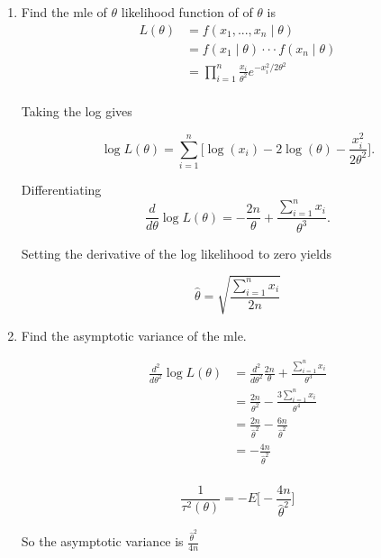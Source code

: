 \documentclass{tufte-book}
\theoremstyle{mytheoremstyle}
\theoremstyle{mylemstyle}
\theoremstyle{mydefstyle}
\begin{document}
\begin{enumerate}
\item Find the mle of $\theta$
 likelihood function of of $\theta$ is
\begin{align*}
L(\theta) &= f(x_1,...,x_n \mid \theta)\\
&= f(x_1 \mid \theta) \cdot \cdot \cdot f(x_n \mid \theta)\\
&= \prod_{i=1}^n \frac{x_i}{\theta^2}e^{-x_i^2/2\theta^2}\\
\end{align*}

Taking the log gives

\[ \log L(\theta) = \sum_{i=1}^n \Big[ \log(x_i) - 2\log(\theta) - \frac{x_i^2}{2\theta^2} \Big]. \]

Differentiating
\[ \frac{d}{d\theta} \log L(\theta) = -\frac{2n}{\theta} + \frac{\sum_{i=1}^n x_i}{\theta^3}. \]

Setting the derivative of the log likelihood to zero yields

\[\hat{\theta} = \sqrt{\frac{\sum_{i=1}^n x_i}{2n}} \]
\item Find the asymptotic variance of the mle.

\begin{align*}
\frac{d^2}{d\theta^2} \log L(\theta)  &= \frac{d^2}{d\theta^2} \frac{2n}{\theta} + \frac{\sum_{i=1}^n x_i}{\theta^3}\\
&= \frac{2n}{\theta^2} - \frac{3 \sum_{i=1}^n x_i}{\theta^4} \\
&= \frac{2n}{\hat{\theta}^2} - \frac{6n}{\hat{\theta}^2}\\
&= -\frac{4n}{\hat{\theta}^2}\\
\end{align*}

\[ \frac{1}{\tau^2(\theta)} = -E \Big[ -\frac{4n}{\hat{\theta}^2}\Big] \]

So the asymptotic variance is $\frac{\hat{\theta}^2}{4n}$
\end{enumerate}
\end{document}

